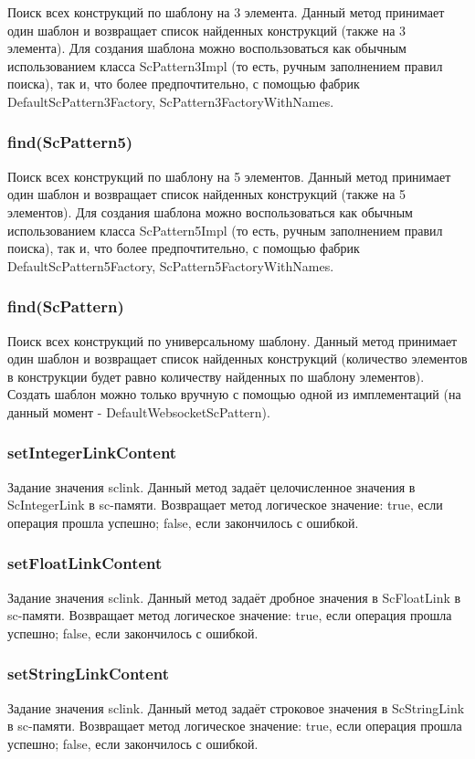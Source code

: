 Поиск всех конструкций по шаблону на 3 элемента. Данный метод принимает один шаблон и возвращает список найденных конструкций (также на 3 элемента). Для создания шаблона можно воспользоваться как обычным использованием класса ScPattern3Impl (то есть, ручным заполнением правил поиска), так и, что более предпочтительно, с помощью фабрик DefaultScPattern3Factory, ScPattern3FactoryWithNames. 


\subsubsection{find(ScPattern5)} 

Поиск всех конструкций по шаблону на 5 элементов. Данный метод принимает один шаблон и возвращает список найденных конструкций (также на 5 элементов). Для создания шаблона можно воспользоваться как обычным использованием класса ScPattern5Impl (то есть, ручным заполнением правил поиска), так и, что более предпочтительно, с помощью фабрик DefaultScPattern5Factory, ScPattern5FactoryWithNames. 


\subsubsection{find(ScPattern)} 

Поиск всех конструкций по универсальному шаблону. Данный метод принимает один шаблон и возвращает список найденных конструкций (количество элементов в конструкции будет равно количеству найденных по шаблону элементов). Создать шаблон можно только вручную с помощью одной из имплементаций (на данный момент - DefaultWebsocketScPattern).


\subsubsection {setIntegerLinkContent} Задание значения sclink. Данный метод задаёт целочисленное значения в ScIntegerLink в sc-памяти. Возвращает метод логическое значение: true, если операция прошла успешно; false, если закончилось с ошибкой. 
\subsubsection {setFloatLinkContent} Задание значения sclink. Данный метод задаёт дробное значения в ScFloatLink в sc-памяти. Возвращает метод логическое значение: true, если операция прошла успешно; false, если закончилось с ошибкой. 
\subsubsection {setStringLinkContent} Задание значения sclink. Данный метод задаёт строковое значения в ScStringLink в sc-памяти. Возвращает метод логическое значение: true, если операция прошла успешно; false, если закончилось с ошибкой. 

